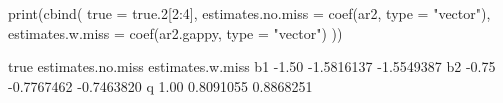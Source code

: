 \begin{Schunk}
\begin{Sinput}
 print(cbind(
   true = true.2[2:4],
   estimates.no.miss = coef(ar2, type = "vector"),
   estimates.w.miss = coef(ar2.gappy, type = "vector")
 ))
\end{Sinput}
\begin{Soutput}
    true estimates.no.miss estimates.w.miss
b1 -1.50        -1.5816137       -1.5549387
b2 -0.75        -0.7767462       -0.7463820
q   1.00         0.8091055        0.8868251
\end{Soutput}
\end{Schunk}
